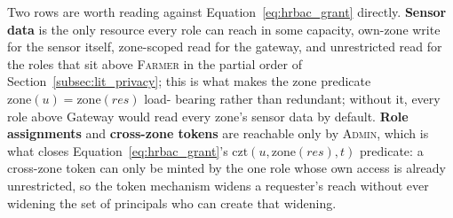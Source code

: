 \documentclass[12pt,a4paper,oneside]{book}
\begin{document}
Two rows are worth reading against Equation~\ref{eq:hrbac_grant} directly.
\textbf{Sensor data} is the only resource every role can reach in some
capacity, own-zone write for the sensor itself, zone-scoped read for the
gateway, and unrestricted read for the roles that sit above \textsc{Farmer}
in the partial order of Section~\ref{subsec:lit_privacy}; this is what
makes the zone predicate $\mathrm{zone}(u) = \mathrm{zone}(res)$ load-
bearing rather than redundant; without it, every role above Gateway would
read every zone's sensor data by default. \textbf{Role assignments} and
\textbf{cross-zone tokens} are reachable only by \textsc{Admin}, which is
what closes Equation~\ref{eq:hrbac_grant}'s $\mathrm{czt}(u,\mathrm{zone}
(res),t)$ predicate: a cross-zone token can only be minted by the one role
whose own access is already unrestricted, so the token mechanism widens a
requester's reach without ever widening the set of principals who can
create that widening.
\clearpage{}
\end{document}

